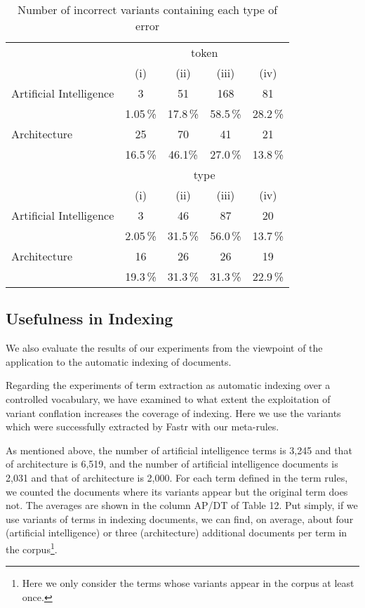 \begin{table*}[htb]
\begin{center}
\begin{tabular}{l|cccc}
\hline
& \multicolumn{4}{|c}{token}\\
& (i) & (ii) & (iii) & (iv)\\
\hline
\hline
Artificial Intelligence & 3 & 51 & 168 & 81\\
& 1.05\,\% & 17.8\,\% & 58.5\,\% & 28.2\,\%\\
\hline
Architecture & 25 & 70 & 41 & 21\\
& 16.5\,\% & 46.1\% & 27.0\,\% & 13.8\,\%\\
\hline
\hline
& \multicolumn{4}{|c}{type}\\
& (i) & (ii) & (iii) & (iv)\\
\hline
\hline
Artificial Intelligence & 3 & 46 & 87 & 20\\
& 2.05\,\% & 31.5\,\% & 56.0\,\% & 13.7\,\%\\
\hline
Architecture & 16 & 26 & 26 & 19\\
& 19.3\,\% & 31.3\,\% & 31.3\,\% & 22.9\,\%\\
\hline
\end{tabular}

\end{center}
\caption{Number of incorrect variants containing each type of error}
\end{table*}

\subsection{Usefulness in Indexing}

We also evaluate the results of our experiments from the viewpoint of the application to the automatic indexing of documents.

Regarding the experiments of term extraction as automatic indexing over a controlled vocabulary, we have examined to what extent the exploitation of variant conflation increases the coverage of indexing. Here we use the variants which were successfully extracted by Fastr with our meta-rules.

As mentioned above, the number of artificial intelligence terms is 3,245 and that of architecture is 6,519, and the number of artificial intelligence documents is 2,031 and that of architecture is 2,000. For each term defined in the term rules, we counted the documents where its variants appear but the original term does not. The averages are shown in the column AP/DT of Table 12. Put simply, if we use variants of terms in indexing documents, we can find, on average, about four (artificial intelligence) or three (architecture) additional documents per term in the corpus\footnote{Here we only consider the terms whose variants appear in the corpus at least once.}.

